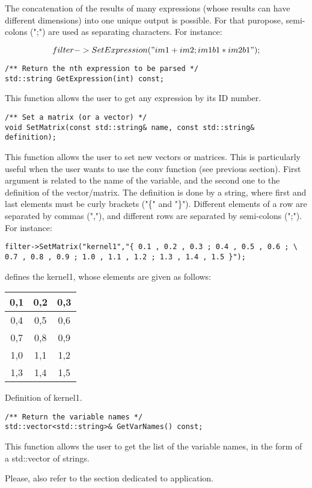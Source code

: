 The concatenation of the results of many expressions (whose results can have different dimensions) into one unique output is possible. For that puropose, semi-colons (";") are used as separating characters. For instance:


\begin{equation}
	filter->SetExpression("im1 + im2 ; im1b1*im2b1");
\end{equation}


\begin{verbatim}
/** Return the nth expression to be parsed */
std::string GetExpression(int) const;
\end{verbatim}

This function allows the user to get any expression by its ID number.

\begin{verbatim}
/** Set a matrix (or a vector) */
void SetMatrix(const std::string& name, const std::string& definition);
\end{verbatim}

This function allows the user to set new vectors or matrices. This is particularly useful when the user wants to use the conv function (see previous section). First argument is related to the name of the variable, and the second one to the definition of the vector/matrix. The definition is done by a string, where first and last elements must be curly brackets ("\{" and "\}"). Different elements of a row are separated by commas (","), and different rows are separated by semi-colons (";"). For instance:

\begin{verbatim}
filter->SetMatrix("kernel1","{ 0.1 , 0.2 , 0.3 ; 0.4 , 0.5 , 0.6 ; \
0.7 , 0.8 , 0.9 ; 1.0 , 1.1 , 1.2 ; 1.3 , 1.4 , 1.5 }");
\end{verbatim}

defines the kernel1, whose elements are given as follows:

\begin{center} 
\begin{tabular}{|c|c|c|}
\hline
0,1	& 0,2	& 0,3 \\
\hline
0,4 &	0,5	& 0,6 \\
\hline
0,7 &	0,8	& 0,9 \\
\hline
1,0	& 1,1	& 1,2 \\
\hline
1,3	& 1,4	& 1,5 \\
\hline
\end{tabular}
\end{center}
\caption{Definition of kernel1.}
\label{correctness}


\begin{verbatim}
/** Return the variable names */
std::vector<std::string>& GetVarNames() const;
\end{verbatim}

This function allows the user to get the list of the variable names, in the form of a std::vector of strings.


\newline \newline Please, also refer to the section dedicated to  application.



